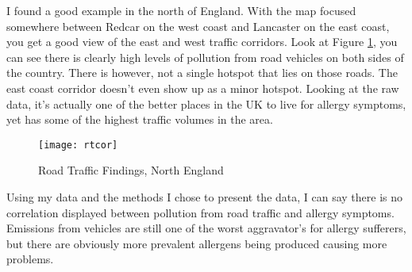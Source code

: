 I found a good example in the north of England. With the map focused somewhere between Redcar on the west coast and Lancaster on the east coast, you get a good view of the east and west traffic corridors. Look at Figure \ref{fig:rtcor}, you can see there is clearly high levels of pollution from road vehicles on both sides of the country. There is however, not a single hotspot that lies on those roads. The east coast corridor doesn't even show up as a minor hotspot. Looking at the raw data, it's actually one of the better places in the UK to live for allergy symptoms, yet has some of the highest traffic volumes in the area.\\

\begin{figure}[H]
\begin{center}
\texttt{[image: rtcor]}
\label{fig:rtcor}
\caption{Road Traffic Findings, North England}
\end{center}
\end{figure}

Using my data and the methods I chose to present the data, I can say there is no correlation displayed between pollution from road traffic and allergy symptoms. Emissions from vehicles are still one of the worst aggravator's for allergy sufferers, but there are obviously more prevalent allergens being produced causing more problems. 
